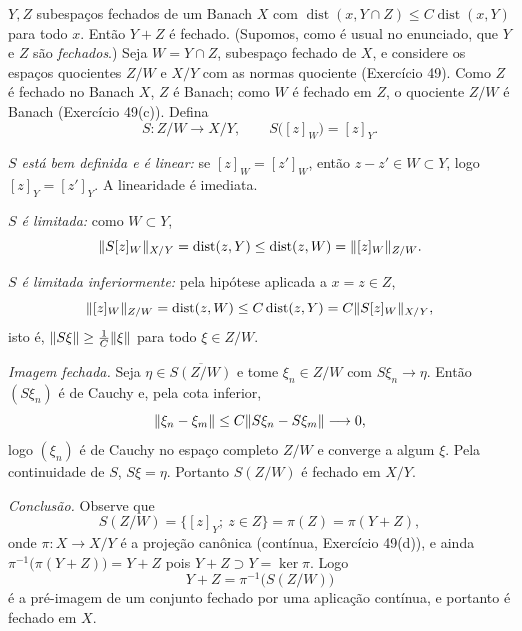 \begin{exercicio}{$Y,Z$ subespaços fechados de um Banach $X$ com $\operatorname{dist}(x,Y\cap Z)\le C\operatorname{dist}(x,Y)$ para todo $x$. Então $Y+Z$ é fechado.}
\sol
(Supomos, como é usual no enunciado, que $Y$ e $Z$ são \emph{fechados}.) Seja $W=Y\cap Z$, subespaço fechado de $X$, e considere os espaços quocientes $Z/W$ e $X/Y$ com as normas quociente (Exercício 49). Como $Z$ é fechado no Banach $X$, $Z$ é Banach; como $W$ é fechado em $Z$, o quociente $Z/W$ é Banach (Exercício 49(c)). Defina
\[ S:Z/W\to X/Y,\qquad S\bigl([z]_W\bigr)=[z]_Y . \]

\emph{$S$ está bem definida e é linear:} se $[z]_W=[z']_W$, então $z-z'\in W\subset Y$, logo $[z]_Y=[z']_Y$. A linearidade é imediata.

\emph{$S$ é limitada:} como $W\subset Y$,
\[ \lVert S[z]_W\rVert_{X/Y}=\operatorname{dist}(z,Y)\le\operatorname{dist}(z,W)=\lVert[z]_W\rVert_{Z/W}. \]

\emph{$S$ é limitada inferiormente:} pela hipótese aplicada a $x=z\in Z$,
\[ \lVert[z]_W\rVert_{Z/W}=\operatorname{dist}(z,W)\le C\operatorname{dist}(z,Y)=C\lVert S[z]_W\rVert_{X/Y}, \]
isto é, $\lVert S\xi\rVert\ge\frac1C\lVert\xi\rVert$ para todo $\xi\in Z/W$.

\emph{Imagem fechada.} Seja $\eta\in\overline{S(Z/W)}$ e tome $\xi_n\in Z/W$ com $S\xi_n\to\eta$. Então $(S\xi_n)$ é de Cauchy e, pela cota inferior,
\[ \lVert\xi_n-\xi_m\rVert\le C\lVert S\xi_n-S\xi_m\rVert\longrightarrow0, \]
logo $(\xi_n)$ é de Cauchy no espaço completo $Z/W$ e converge a algum $\xi$. Pela continuidade de $S$, $S\xi=\eta$. Portanto $S(Z/W)$ é fechado em $X/Y$.

\emph{Conclusão.} Observe que
\[ S(Z/W)=\{[z]_Y;\ z\in Z\}=\pi(Z)=\pi(Y+Z), \]
onde $\pi:X\to X/Y$ é a projeção canônica (contínua, Exercício 49(d)), e ainda $\pi^{-1}\bigl(\pi(Y+Z)\bigr)=Y+Z$ pois $Y+Z\supset Y=\ker\pi$. Logo
\[ Y+Z=\pi^{-1}\bigl(S(Z/W)\bigr) \]
é a pré-imagem de um conjunto fechado por uma aplicação contínua, e portanto é fechado em $X$.
\end{exercicio}

